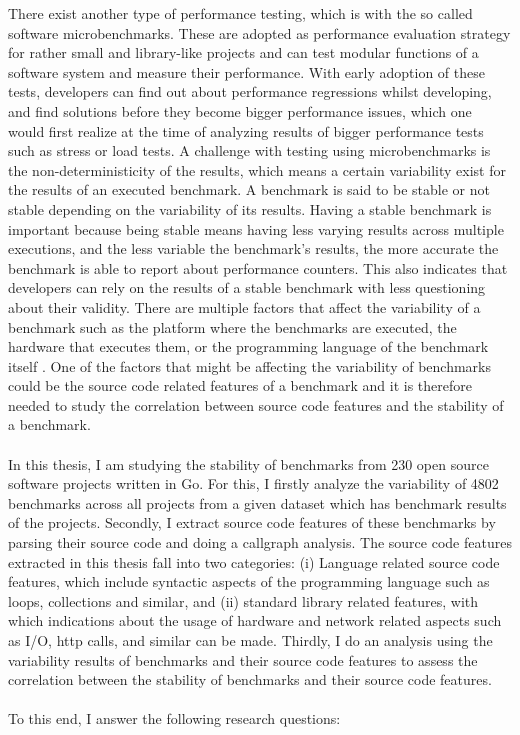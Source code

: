 \documentclass{seal_thesis}
\begin{document}
There exist another type of performance testing, which is with the so called software microbenchmarks. These are adopted as performance evaluation strategy for rather small and library-like projects\cite{laaber2019software} and can test modular functions of a software system and measure their performance\cite{costa2019}. With early adoption of these tests, developers can find out about performance regressions whilst developing, and find solutions before they become bigger performance issues, which one would first realize at the time of analyzing results of bigger performance tests such as stress or load tests. A challenge with testing using microbenchmarks is the non-deterministicity of the results, which means a certain variability exist for the results of an executed benchmark\cite{Laaber:2018:EOS:3196398.3196407}. A benchmark is said to be stable or not stable depending on the variability of its results. Having a stable benchmark is important because being stable means having less varying results across multiple executions, and the less variable the benchmark's results, the more accurate the benchmark is able to report about performance counters. This also indicates that developers can rely on the results of a stable benchmark with less questioning about their validity. There are multiple factors that affect the variability of a benchmark such as the platform where the benchmarks are executed, the hardware that executes them, or the programming language of the benchmark itself \cite{laaber2018performance}. One of the factors that might be affecting the variability of benchmarks could be the source code related features of a benchmark and it is therefore needed to study the correlation between source code features and the stability of a benchmark.\\
\\
In this thesis, I am studying the stability of benchmarks from 230 open source software projects written in Go. For this, I firstly analyze the variability of 4802 benchmarks across all projects from a given dataset which has benchmark results of the projects. Secondly, I extract source code features of these benchmarks by parsing their source code and doing a callgraph analysis. The source code features extracted in this thesis fall into two categories: (i) Language related source code features, which include syntactic aspects of the programming language such as loops, collections and similar, and (ii) standard library related features, with which indications about the usage of hardware and network related aspects such as I/O, http calls, and similar can be made. Thirdly, I do an analysis using the variability results of benchmarks and their source code features to assess the correlation between the stability of benchmarks and their source code features.\\
\\
To this end, I answer the following research questions: 
\end{document}
